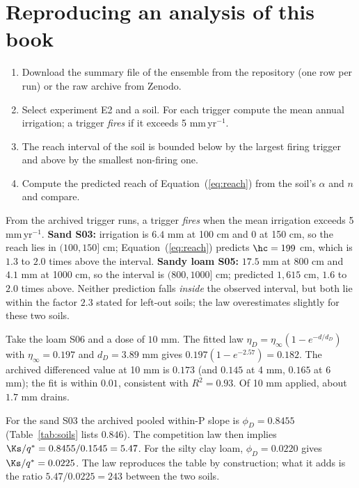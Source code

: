 \section{Reproducing an analysis of this book}
\begin{enumerate}[leftmargin=*]
\item Download the summary file of the ensemble from the repository (one row per run) or the raw archive from Zenodo.
\item Select experiment E2 and a soil. For each trigger compute the mean annual irrigation; a trigger \emph{fires} if it exceeds 5 mm\,yr$^{-1}$.
\item The reach interval of the soil is bounded below by the largest firing trigger and above by the smallest non-firing one.
\item Compute the predicted reach of Equation~(\ref{eq:reach}) from the soil's $\alpha$ and $n$ and compare.
\end{enumerate}
\sol  From the archived trigger runs, a trigger \emph{fires} when the mean irrigation exceeds 5 mm\,yr$^{-1}$. \textbf{Sand S03:} irrigation is $6.4$ mm at 100 cm and $0$ at 150 cm, so the reach lies in $(100,150]$ cm; Equation~(\ref{eq:reach}) predicts $\hc=199$ cm, which is $1.3$ to $2.0$ times above the interval. \textbf{Sandy loam S05:} $17.5$ mm at 800 cm and $4.1$ mm at 1000 cm, so the interval is $(800,1000]$ cm; predicted $1{,}615$ cm, $1.6$ to $2.0$ times above. Neither prediction falls \emph{inside} the observed interval, but both lie within the factor $2.3$ stated for left-out soils; the law overestimates slightly for these two soils.

\sol  Take the loam S06 and a dose of $10$ mm. The fitted law $\eta_D=\eta_\infty(1-e^{-d/d_D})$ with $\eta_\infty=0.197$ and $d_D=3.89$ mm gives $0.197(1-e^{-2.57})=0.182$. The archived differenced value at 10 mm is $0.173$ (and $0.145$ at 4 mm, $0.165$ at 6 mm); the fit is within $0.01$, consistent with $R^2=0.93$. Of 10 mm applied, about $1.7$ mm drains.

\sol  For the sand S03 the archived pooled within-P slope is $\phi_D=0.8455$ (Table~\ref{tab:soils} lists $0.846$). The competition law then implies $\Ks/q^*=0.8455/0.1545=5.47$. For the silty clay loam, $\phi_D=0.0220$ gives $\Ks/q^*=0.0225$. The law reproduces the table by construction; what it adds is the ratio $5.47/0.0225=243$ between the two soils.



